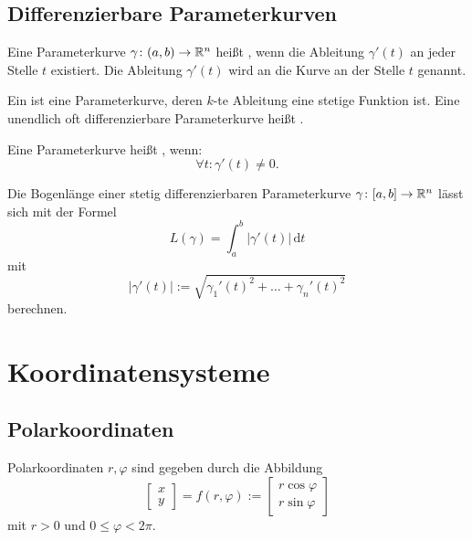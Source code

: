 \subsection{Differenzierbare Parameterkurven}

\begin{definition}\mbox{}\newline
Eine Parameterkurve $\gamma\colon (a,b)\to\mathbb R^n$ heißt
, wenn die Ableitung $\gamma'(t)$ an jeder Stelle
$t$ existiert. Die Ableitung $\gamma'(t)$ wird
 an die Kurve an der Stelle $t$ genannt.

Ein  ist eine Parameterkurve, deren $k$-te Ableitung
eine stetige Funktion ist. Eine unendlich oft differenzierbare
Parameterkurve heißt .

Eine Parameterkurve heißt , wenn:
\begin{equation}
\forall t\colon \gamma'(t)\ne 0.
\end{equation}
\end{definition}

\noindent
{} Die Bogenlänge einer stetig differenzierbaren
Parameterkurve $\gamma\colon [a,b]\to\mathbb R^n$ lässt sich mit
der Formel
\begin{equation}
L(\gamma) = \int_a^b |\gamma'(t)|\,\mathrm dt
\end{equation}
mit
\begin{equation}
|\gamma'(t)| := \sqrt{\gamma_1'(t)^2+\ldots+\gamma_n'(t)^2}
\end{equation}
berechnen.

\section{Koordinatensysteme}
\subsection{Polarkoordinaten}
Polarkoordinaten $r,\varphi$ sind gegeben durch
die Abbildung%
\begin{equation}
\begin{bmatrix}x\\ y\end{bmatrix}
=f(r,\varphi)
:=\begin{bmatrix}
r\cos\varphi\\
r\sin\varphi
\end{bmatrix}
\end{equation}
mit $r>0$ und $0\le\varphi<2\pi$.

